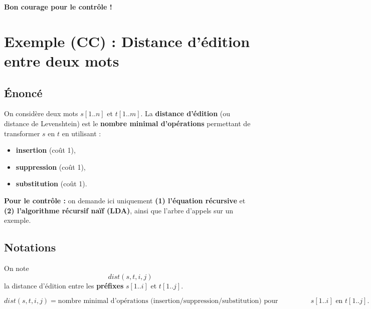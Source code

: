 \documentclass[12pt,a4paper]{article}
\begin{document}
\vspace{2em}

\begin{center}
\large\textbf{Bon courage pour le contrôle !}
\end{center}


\newpage
\section{Exemple (CC) : Distance d'édition entre deux mots}

\subsection{Énoncé}
On considère deux mots $s[1..n]$ et $t[1..m]$.
La \textbf{distance d'édition} (ou distance de Levenshtein) est le \textbf{nombre minimal d'opérations} permettant de transformer $s$ en $t$ en utilisant :
\begin{itemize}
    \item \textbf{insertion} (coût 1),
    \item \textbf{suppression} (coût 1),
    \item \textbf{substitution} (coût 1).
\end{itemize}

\begin{important}
\textbf{Pour le contrôle :} on demande ici uniquement \textcolor{importantrouge}{\textbf{(1) l'équation récursive}} et \textcolor{importantrouge}{\textbf{(2) l'algorithme récursif naïf (LDA)}}, ainsi que l'arbre d'appels sur un exemple.
\end{important}

\subsection{Notations}
On note
\[
dist(s,t,i,j)
\]
la distance d'édition entre les \textbf{préfixes} $s[1..i]$ et $t[1..j]$.

\begin{definition}
\[
dist(s,t,i,j) = \text{nombre minimal d'opérations (insertion/suppression/substitution) pour transformer } s[1..i] \text{ en } t[1..j].
\]
\end{definition}

\end{document}
